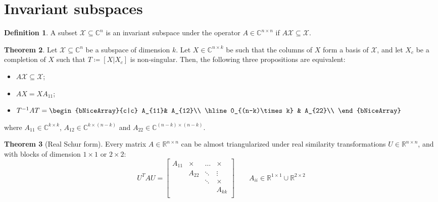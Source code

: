 \documentclass[12pt, openany]{report}
\theoremstyle{definition}
\newtheorem{thm}{Theorem}[chapter]
\newtheorem{definition}[thm]{Definition}
\newcommand{\R}{\mathbb{R}}
\newcommand{\C}{\mathbb{C}}
\begin{document}
\section{Invariant subspaces}
\begin{definition}
    A subset $\mathcal{X}\subseteq \C^n$ is an invariant subspace under the operator $A\in \C^{n\times n}$ if $A\mathcal{X}\subseteq \mathcal{X}$.
\end{definition}
\begin{thm}
    Let $\mathcal{X}\subseteq \C^n$ be a subspace of dimension $k$. Let $X\in \C^{n\times k}$ be such that the columns of $X$ form a basis of $\mathcal{X}$, and let $X_c$ be a completion of $X$ such that $T\coloneqq [X|X_c]$ is non-singular. Then, the following three propositions are equivalent:
    \begin{itemize}
        \item $A\mathcal{X}\subseteq \mathcal{X}$;
        \item $AX=XA_{11}$;
        \item $T^{-1}AT=\begin{bNiceArray}{c|c}
            A_{11}& A_{12}\\
            \hline
            0_{(n-k)\times k} & A_{22}\\
        \end{bNiceArray}$
    \end{itemize}
    where $A_{11}\in \C^{k\times k}$, $A_{12}\in \C^{k\times (n-k)}$ and $A_{22}\in \C^{(n-k)\times (n-k)}$.
\end{thm}
\begin{thm}[Real Schur form]
    Every matrix $A\in \R^{n\times n}$ can be almost triangularized under real similarity transformations $U\in \R^{n\times n}$, and with blocks of dimension $1\times 1$ or $2\times 2$:
    \begin{equation}
        U^TAU = \begin{bmatrix}
            A_{11} & \times & \dots & \times\\
            & A_{22} & \ddots & \vdots\\
            &&\ddots & \times\\
            &&& A_{kk}\\ 
            \end{bmatrix} \qquad A_{ii}\in \R^{1\times 1}\cup \R^{2\times 2}
    \end{equation} 
\end{thm}
\end{document}
